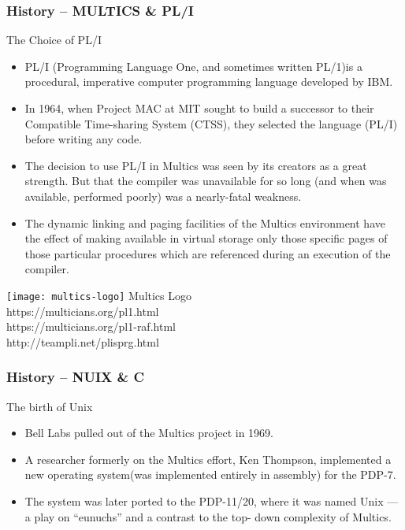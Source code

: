 \begin{frame}[plain]
	\frametitle{History -- MULTICS \& PL/I}
	
	The Choice of PL/I
    \begin{itemize}
		\item PL/I (Programming Language One, and sometimes written PL/1)is a procedural, imperative computer programming language developed by IBM.
		\item In 1964, when Project MAC at MIT sought to build a successor
		to their Compatible Time-sharing System (CTSS), they selected
		the language (PL/I) before writing any code.
		\item The decision to use PL/I in Multics was seen by its creators as a
		great strength. But that the compiler was unavailable for so long (and when
		was available, performed poorly) was a nearly-fatal weakness.
		\item The dynamic linking and paging facilities of the Multics environment have the effect of making available in virtual storage only those specific pages of those particular procedures which are referenced during an execution of the compiler. 
		
	
	\end{itemize}
	
	\texttt{[image: multics-logo]}
	\tiny Multics Logo \\ https://multicians.org/pl1.html \\ https://multicians.org/pl1-raf.html \\ http://teampli.net/plisprg.html
	
	
\end{frame}

\begin{frame}[plain]
	\frametitle{History -- NUIX \& C}
	
	The birth of Unix
	\begin{itemize}

		\item Bell Labs pulled out of the Multics project in 1969.
		
		\item A researcher formerly on the Multics effort, Ken Thompson,
		implemented a new operating system(was implemented entirely in assembly) for the PDP-7.
		\item The system was later ported to the PDP-11/20, where it was
		named Unix — a play on “eunuchs” and a contrast to the top-
		down complexity of Multics. 
		
		
		
	\end{itemize}
	
	
\end{frame}



